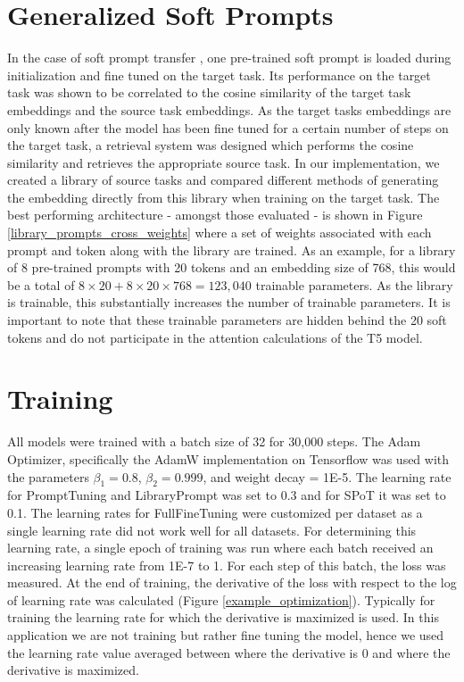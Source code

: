 \documentclass[final,6p,times,twocolumn,authoryear]{elsarticle}
\begin{document}
\section{Generalized Soft Prompts}
In the case of soft prompt transfer \citep{vu_2022}, one pre-trained soft prompt is loaded during initialization and fine tuned on the target task. Its performance on the target task was shown to be correlated to the cosine similarity of the target task embeddings and the source task embeddings. As the target tasks embeddings are only known after the model has been fine tuned for a certain number of steps on the target task, a retrieval system was designed which performs the cosine similarity and retrieves the appropriate source task. In our implementation, we created a library of source tasks and compared different methods of generating the embedding directly from this library when training on the target task. The best performing architecture - amongst those evaluated - is shown in Figure \ref{library_prompts_cross_weights} where a set of weights associated with each prompt and token along with the library are trained. As an example, for a library of 8 pre-trained prompts with 20 tokens and an embedding size of 768, this would be a total of $8 \times 20 + 8 \times 20 \times 768=123,040$ trainable parameters. As the library is trainable, this substantially increases the number of trainable parameters.  It is important to note that these trainable parameters are hidden behind the 20 soft tokens and do not participate in the attention calculations of the T5 model.


\section{Training}
All models were trained with a batch size of 32 for 30,000 steps. The Adam Optimizer, specifically the AdamW implementation on Tensorflow was used with the parameters $\beta_1=0.8$, $\beta_2=0.999$, and weight decay = 1E-5. The learning rate for PromptTuning and LibraryPrompt was set to 0.3 and for SPoT it was set to 0.1.  The learning rates for FullFineTuning were customized per dataset as a single learning rate did not work well for all datasets. For determining this learning rate, a single epoch of training was run where each batch received an increasing learning rate from 1E-7 to 1. For each step of this batch, the loss was measured. At the end of training, the derivative of the loss with respect to the log of learning rate was calculated (Figure \ref{example_optimization}). Typically for training the learning rate for which the derivative is maximized is used. In this application we are not training but rather fine tuning the model, hence we used the learning rate value averaged between where the derivative is 0 and where the derivative is maximized.
\end{document}
